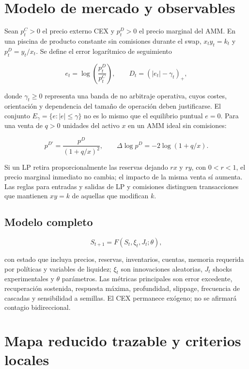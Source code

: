 \section{Modelo de mercado y observables}

Sean $p_t^C>0$ el precio externo CEX y $p_t^D>0$ el precio marginal del AMM. En una
piscina de producto constante sin comisiones durante el swap, $x_ty_t=k_t$ y
$p_t^D=y_t/x_t$. Se define el error logarítmico de seguimiento

\begin{equation}
  e_t=\log\left(\frac{p_t^D}{p_t^C}\right), \qquad
  D_t=(|e_t|-\gamma_t)_+,
\end{equation}

donde $\gamma_t\geq 0$ representa una banda de no arbitraje operativa, cuyos costes,
orientación y dependencia del tamaño de operación deben justificarse. El conjunto
$E_\gamma=\{e:|e|\leq\gamma\}$ no es lo mismo que el equilibrio puntual $e=0$. Para
una venta de $q>0$ unidades del activo $x$ en un AMM ideal sin comisiones:

\begin{equation}
  p^{D\prime}=\frac{p^D}{(1+q/x)^2}, \qquad
  \Delta\log p^D=-2\log(1+q/x).
\end{equation}

Si un LP retira proporcionalmente las reservas dejando $rx$ y $ry$, con $0<r<1$, el
precio marginal inmediato no cambia; el impacto de la misma venta sí aumenta. Las
reglas para entradas y salidas de LP y comisiones distinguen transacciones que
mantienen $xy=k$ de aquellas que modifican $k$.

\subsection{Modelo completo}

\begin{equation}
  S_{t+1}=F(S_t,\xi_t,J_t;\theta),
\end{equation}

con estado que incluya precios, reservas, inventarios, cuentas, memoria requerida por
políticas y variables de liquidez; $\xi_t$ son innovaciones aleatorias, $J_t$ shocks
experimentales y $\theta$ parámetros. Las métricas principales son error excedente,
recuperación sostenida, respuesta máxima, profundidad, slippage, frecuencia de
cascadas y sensibilidad a semillas. El CEX permanece exógeno; no se afirmará contagio
bidireccional.

\section{Mapa reducido trazable y criterios locales}

